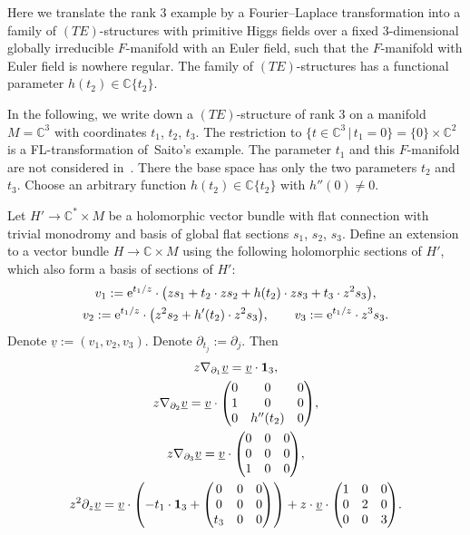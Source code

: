 \documentclass[pdftex]{sigma}%
\numberwithin{equation}{section}
\numberwithin{figure}{section}
\newcommand{\C}{{\mathbb C}}
\newcommand{\uuuu}{\underline}
\newcommand{\paa}{\partial}
\newcommand{\nnn}{\nabla}
\begin{document}
Here we translate the rank 3 example
by a Fourier--Laplace transformation
into a family of $(TE)$-structures
with primitive Higgs fields over a fixed
3-dimensional globally irreducible
$F$-manifold with an Euler field, such that the
$F$-manifold with Euler field is nowhere regular.
The family of $(TE)$-structures has a functional parameter
$h(t_2)\in\C\{t_2\}$.

In the following, we write down a $(TE)$-structure of rank 3
on a manifold $M=\C^3$ with coordinates $t_1$, $t_2$, $t_3$.
The restriction to
$\big\{t\in\C^3\,|\, t_1=0\big\}=\{0\}\times \C^2$
is a FL-transformation of~Saito's example.
The parameter $t_1$ and this $F$-manifold are
not considered in~\cite{SaM17}. There the base
space has only the two parameters $t_2$ and $t_3$.
Choose an arbitrary function $h(t_2)\in\C\{t_2\}$
with $h''(0)\neq 0$.

Let $H'\to\C^*\times M$ be a holomorphic vector bundle
with flat connection with trivial monodromy and basis of
global flat sections $s_1$, $s_2$, $s_3$. Define an extension
to a vector bundle $H\to\C\times M$ using the following
holomorphic sections of $H'$, which also form a basis
of sections of $H'$:
\begin{gather*}%
v_1:= {\rm e}^{t_1/z}\cdot \big(zs_1+t_2\cdot zs_2+
h(t_2)\cdot zs_3+t_3\cdot z^2s_3\big),\\
v_2:= {\rm e}^{t_1/z}\cdot \big(z^2s_2+h'(t_2)\cdot z^2s_3\big),\qquad
v_3:= {\rm e}^{t_1/z}\cdot z^3s_3.\nonumber
\end{gather*}
Denote $\uuuu{v}:=(v_1,v_2,v_3)$.
Denote $\paa_{t_j}:=\paa_j$. Then
\begin{gather*}%
z\nnn_{\paa_1}\uuuu{v}= \uuuu{v}\cdot {\bf 1}_3,\\
z\nnn_{\paa_2}\uuuu{v}= \uuuu{v}\cdot
\begin{pmatrix}0&0&0\\1&0&0\\0&h''(t_2)&0\end{pmatrix}\!,
\nonumber\\
z\nnn_{\paa_3}\uuuu{v}= \uuuu{v}\cdot
\begin{pmatrix}0&0&0\\0&0&0\\1&0&0\end{pmatrix}\!,\nonumber\\
z^2\paa_z\uuuu{v}= \uuuu{v}\cdot
\left({-}t_1\cdot {\bf 1}_3
+\begin{pmatrix}0&0&0\\0&0&0\\t_3&0&0\end{pmatrix}\right)
+z\cdot\uuuu{v}\cdot
\begin{pmatrix}1&0&0\\0&2&0\\0&0&3\end{pmatrix}\!.\nonumber
\end{gather*}
\end{document}
